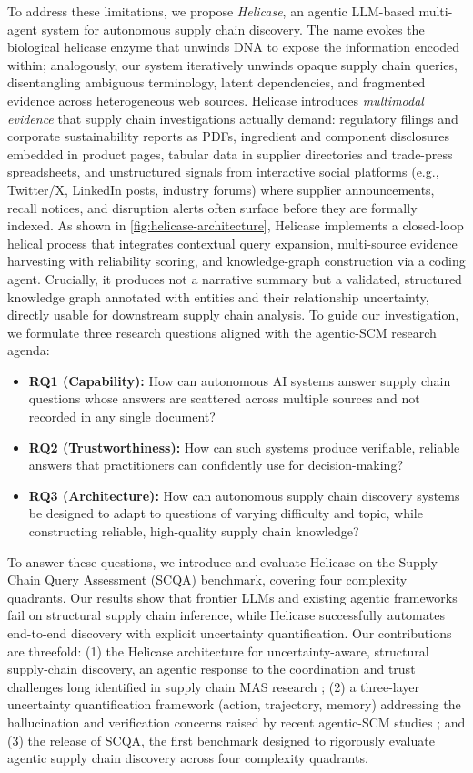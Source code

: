 \documentclass{article}
\begin{document}
To address these limitations, we propose \textit{Helicase}, an agentic LLM-based multi-agent system for autonomous supply chain discovery. The name evokes the biological helicase enzyme that unwinds DNA to expose the information encoded within; analogously, our system iteratively unwinds opaque supply chain queries, disentangling ambiguous terminology, latent dependencies, and fragmented evidence across heterogeneous web sources. Helicase introduces \emph{multimodal evidence} that supply chain investigations actually demand: regulatory filings and corporate sustainability reports as PDFs, ingredient and component disclosures embedded in product pages, tabular data in supplier directories and trade-press spreadsheets, and unstructured signals from interactive social platforms (e.g., Twitter/X, LinkedIn posts, industry forums) where supplier announcements, recall notices, and disruption alerts often surface before they are formally indexed. As shown in \autoref{fig:helicase-architecture}, Helicase implements a closed-loop helical process that integrates contextual query expansion, multi-source evidence harvesting with reliability scoring, and knowledge-graph construction via a coding agent. Crucially, it produces not a narrative summary but a validated, structured knowledge graph annotated with entities and their relationship uncertainty, directly usable for downstream supply chain analysis.
To guide our investigation, we formulate three research questions aligned with the agentic-SCM research agenda:
\begin{itemize}
\item \textbf{RQ1 (Capability):} How can autonomous AI systems answer supply chain questions whose answers are scattered across multiple sources and not recorded in any single document?
\item \textbf{RQ2 (Trustworthiness):} How can such systems produce verifiable, reliable answers that practitioners can confidently use for decision-making?
\item \textbf{RQ3 (Architecture):} How can autonomous supply chain discovery systems be designed to adapt to questions of varying difficulty and topic, while constructing reliable, high-quality supply chain knowledge?
\end{itemize}

To answer these questions, we introduce and evaluate Helicase on the Supply Chain Query Assessment (SCQA) benchmark, covering four complexity quadrants. Our results show that frontier LLMs and existing agentic frameworks fail on structural supply chain inference, while Helicase successfully automates end-to-end discovery with explicit uncertainty quantification. Our contributions are threefold: (1) the Helicase architecture for uncertainty-aware, structural supply-chain discovery, an agentic response to the coordination and trust challenges long identified in supply chain MAS research \citep{xu2021bots}; (2) a three-layer uncertainty quantification framework (action, trajectory, memory) addressing the hallucination and verification concerns raised by recent agentic-SCM studies \citep{jannelli2025agentic,menache2025generative}; and (3) the release of SCQA, the first benchmark designed to rigorously evaluate agentic supply chain discovery across four complexity quadrants.
\end{document}
